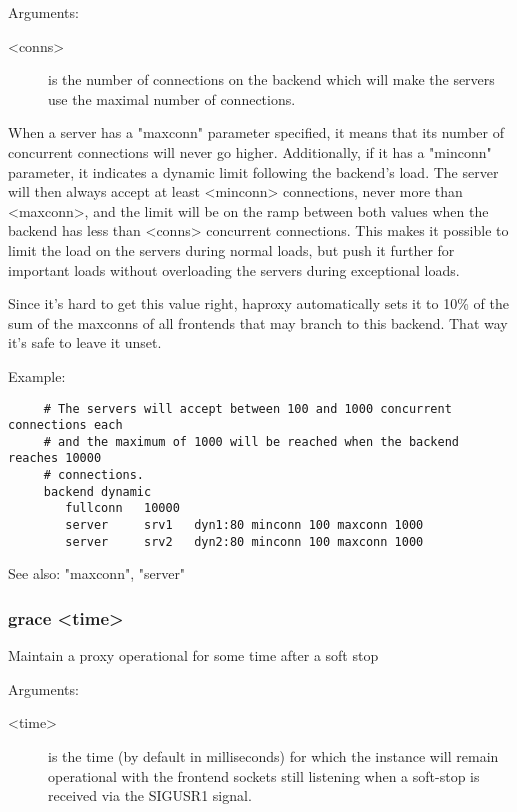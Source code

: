   
  Arguments:
  \begin{description}
  \item[<conns>]   is the number of connections on the backend which will make the
              servers use the maximal number of connections.
  \end{description}

  When a server has a "maxconn" parameter specified, it means that its number
  of concurrent connections will never go higher. Additionally, if it has a
  "minconn" parameter, it indicates a dynamic limit following the backend's
  load. The server will then always accept at least <minconn> connections,
  never more than <maxconn>, and the limit will be on the ramp between both
  values when the backend has less than <conns> concurrent connections. This
  makes it possible to limit the load on the servers during normal loads, but
  push it further for important loads without overloading the servers during
  exceptional loads.

  Since it's hard to get this value right, haproxy automatically sets it to
  10\% of the sum of the maxconns of all frontends that may branch to this
  backend. That way it's safe to leave it unset.

  Example:
  
  \begin{verbatim}
     # The servers will accept between 100 and 1000 concurrent connections each
     # and the maximum of 1000 will be reached when the backend reaches 10000
     # connections.
     backend dynamic
        fullconn   10000
        server     srv1   dyn1:80 minconn 100 maxconn 1000
        server     srv2   dyn2:80 minconn 100 maxconn 1000
  \end{verbatim}

  See also: "maxconn", "server"

\subsubsection[grace]{grace <time>}
  Maintain a proxy operational for some time after a soft stop
  
  
  Arguments:
  \begin{description}
  \item[<time>]    is the time (by default in milliseconds) for which the instance
              will remain operational with the frontend sockets still listening
              when a soft-stop is received via the SIGUSR1 signal.
  \end{description}

